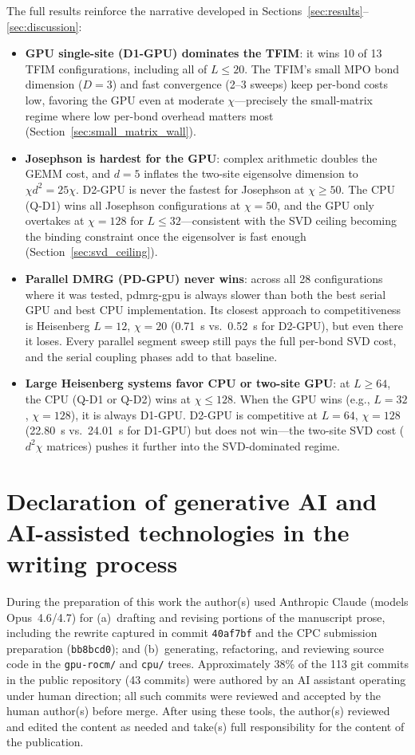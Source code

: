\documentclass[preprint,12pt]{elsarticle}
\begin{document}
The full results reinforce the narrative developed in Sections~\ref{sec:results}--\ref{sec:discussion}:
\begin{itemize}
  \item \textbf{GPU single-site (D1-GPU) dominates the TFIM}: it wins 10 of 13 TFIM configurations, including all of $L \leq 20$.
  The TFIM's small MPO bond dimension ($D = 3$) and fast convergence (2--3 sweeps) keep per-bond costs low, favoring the GPU even at moderate $\chi$---precisely the small-matrix regime where low per-bond overhead matters most (Section~\ref{sec:small_matrix_wall}).
  \item \textbf{Josephson is hardest for the GPU}: complex arithmetic doubles the GEMM cost, and $d = 5$ inflates the two-site eigensolve dimension to $\chi d^2 = 25\chi$.
  D2-GPU is never the fastest for Josephson at $\chi \geq 50$.
  The CPU (Q-D1) wins all Josephson configurations at $\chi = 50$, and the GPU only overtakes at $\chi = 128$ for $L \leq 32$---consistent with the SVD ceiling becoming the binding constraint once the eigensolver is fast enough (Section~\ref{sec:svd_ceiling}).
  \item \textbf{Parallel DMRG (PD-GPU) never wins}: across all 28 configurations where it was tested, pdmrg-gpu is always slower than both the best serial GPU and best CPU implementation.
  Its closest approach to competitiveness is Heisenberg $L = 12$, $\chi = 20$ (0.71~s vs.\ 0.52~s for D2-GPU), but even there it loses.
  Every parallel segment sweep still pays the full per-bond SVD cost, and the serial coupling phases add to that baseline.
  \item \textbf{Large Heisenberg systems favor CPU or two-site GPU}: at $L \geq 64$, the CPU (Q-D1 or Q-D2) wins at $\chi \leq 128$.
  When the GPU wins (e.g., $L = 32$, $\chi = 128$), it is always D1-GPU.
  D2-GPU is competitive at $L = 64$, $\chi = 128$ (22.80~s vs.\ 24.01~s for D1-GPU) but does not win---the two-site SVD cost ($d^2 \chi$ matrices) pushes it further into the SVD-dominated regime.
\end{itemize}

\section*{Declaration of generative AI and AI-assisted technologies in the writing process}

During the preparation of this work the author(s) used Anthropic Claude (models Opus~4.6/4.7) for
(a)~drafting and revising portions of the manuscript prose, including the rewrite captured in
commit \texttt{40af7bf} and the CPC submission preparation (\texttt{bb8bcd0}); and
(b)~generating, refactoring, and reviewing source code in the \texttt{gpu-rocm/} and \texttt{cpu/} trees.
Approximately 38\% of the 113 git commits in the public repository (43 commits) were authored by an
AI assistant operating under human direction; all such commits were reviewed and accepted by the
human author(s) before merge.
After using these tools, the author(s) reviewed and edited the content as needed and take(s) full
responsibility for the content of the publication.
\end{document}
